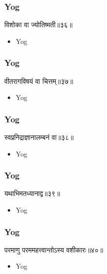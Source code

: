 \begin{frame}[fragile]\frametitle{Yog}
\begin{sanskrit}
विशोका वा ज्योतिष्मती॥३६॥
\end{sanskrit}
	\begin{itemize}
	\item Yog 
	\end{itemize}
\end{frame}




\begin{frame}[fragile]\frametitle{Yog}
\begin{sanskrit}
वीतरागविषयं वा चित्तम्॥३७॥
\end{sanskrit}
	\begin{itemize}
	\item Yog 
	\end{itemize}
\end{frame}


\begin{frame}[fragile]\frametitle{Yog}
\begin{sanskrit}
स्वप्ननिद्राज्ञानालम्बनं वा॥३८॥
\end{sanskrit}
	\begin{itemize}
	\item Yog 
	\end{itemize}
\end{frame}



\begin{frame}[fragile]\frametitle{Yog}
\begin{sanskrit}
यथाभिमतध्यानाद्व॥३९॥
\end{sanskrit}
	\begin{itemize}
	\item Yog 
	\end{itemize}
\end{frame}




\begin{frame}[fragile]\frametitle{Yog}
\begin{sanskrit}
परमाणु परममहत्त्वान्तोऽस्य वशीकारः॥४०॥
\end{sanskrit}
	\begin{itemize}
	\item Yog 
	\end{itemize}
\end{frame}

